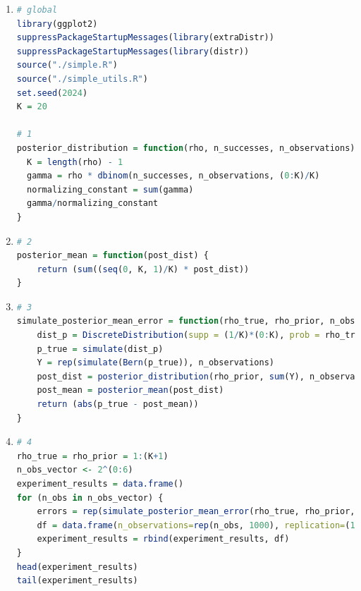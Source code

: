 \documentclass{article}
\begin{document}
\begin{enumerate}
\item 
\begin{lstlisting}[language=R]
# global
library(ggplot2)
suppressPackageStartupMessages(library(extraDistr))
suppressPackageStartupMessages(library(distr))
source("./simple.R")
source("./simple_utils.R")
set.seed(2024)
K = 20

# 1
posterior_distribution = function(rho, n_successes, n_observations) {
  K = length(rho) - 1
  gamma = rho * dbinom(n_successes, n_observations, (0:K)/K)
  normalizing_constant = sum(gamma)
  gamma/normalizing_constant
} 
\end{lstlisting}


\item 
\begin{lstlisting}[language=R]
# 2
posterior_mean = function(post_dist) {
    return (sum((seq(0, K, 1)/K) * post_dist))
}
\end{lstlisting}

\item 
\begin{lstlisting}[language=R]
# 3
simulate_posterior_mean_error = function(rho_true, rho_prior, n_observations){
    dist_p = DiscreteDistribution(supp = (1/K)*(0:K), prob = rho_true/sum(rho_true))
    p_true = simulate(dist_p)
    Y = rep(simulate(Bern(p_true)), n_observations)
    post_dist = posterior_distribution(rho_prior, sum(Y), n_observations)
    post_mean = posterior_mean(post_dist)
    return (abs(p_true - post_mean))
}
\end{lstlisting}

\item 
\begin{lstlisting}[language=R]
# 4
rho_true = rho_prior = 1:(K+1)
n_obs_vector <- 2^(0:6)
experiment_results = data.frame()
for (n_obs in n_obs_vector) {
    errors = rep(simulate_posterior_mean_error(rho_true, rho_prior, n_obs), 1000)
    df = data.frame(n_observations=rep(n_obs, 1000), replication=(1:1000), errors=errors)
    experiment_results = rbind(experiment_results, df)
}
head(experiment_results)
tail(experiment_results)
\end{lstlisting}



\end{enumerate}
\end{document}
